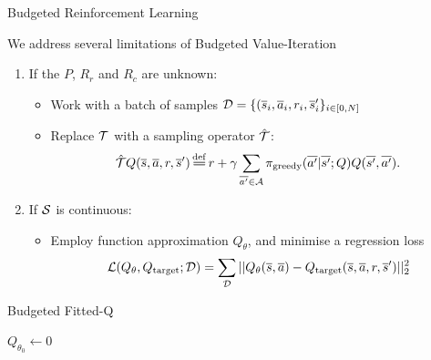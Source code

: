 \documentclass{beamer}
\begin{document}
    \begin{frame}{Budgeted Reinforcement Learning}

        We address several limitations of Budgeted Value-Iteration

        \begin{enumerate}
            \pause\item If the $P$, $R_r$ and $R_c$ are unknown:
            \begin{itemize}
                \pause\item Work with a {batch} of samples $\mathcal{D}=\{(\overline{s}_i,\overline{a}_i,r_i,\overline{s}_i'\}_{i\in [0,N]}$
                \pause\item Replace $\mathcal{T}$ with a sampling operator $\hat{\mathcal{T}}$:
                \begin{equation*}
                    \hat{\cT} Q(\os, \oa, r, \os') \eqdef r + \gamma \sum_{\ov{a'}\in \cA} \pi_\text{greedy}(\ov{a'}|\ov{s'}; Q) Q(\ov{s'}, \ov{a'}).
                \end{equation*}
            \end{itemize}
            \pause\item If $\mathcal{S}$ is continuous:
            \begin{itemize}
                \pause\item Employ function approximation $Q_\theta$, and minimise a regression loss
                $$\mathcal{L}(Q_\theta, Q_\text{target};\mathcal{D}) = \sum_{\mathcal{D}} ||Q_\theta(\overline{s}, \overline{a}) - Q_\text{target}(\overline{s}, \overline{a}, r, \overline{s}')||_2^2$$
            \end{itemize}

        \end{enumerate}

    \end{frame}

    \begin{frame}{Budgeted Fitted-Q}
        \begin{algorithm}[H]
            \DontPrintSemicolon
            \KwData{$\cD$}
            $Q_{\theta_0} \leftarrow 0$\;
            \caption{Budgeted Fitted-Q Iteration}
        \end{algorithm}
    \end{frame}
\end{document}
